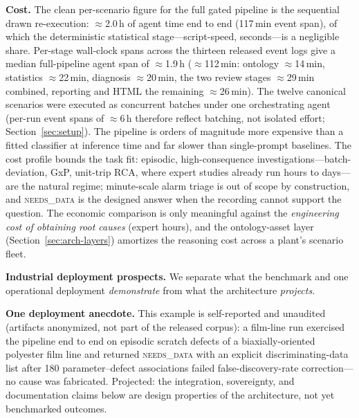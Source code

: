 \documentclass[preprint,10pt]{elsarticle}
\begin{document}
\textbf{Cost.} The clean per-scenario figure for the full gated pipeline is the sequential drawn re-execution: $\approx$2.0\,h of agent time end to end (117\,min event span), of which the deterministic statistical stage---script-speed, seconds---is a negligible share. Per-stage wall-clock spans across the thirteen released event logs give a median full-pipeline agent span of $\approx$1.9\,h ($\approx$112\,min: ontology $\approx$14\,min, statistics $\approx$22\,min, diagnosis $\approx$20\,min, the two review stages $\approx$29\,min combined, reporting and HTML the remaining $\approx$26\,min). The twelve canonical scenarios were executed as concurrent batches under one orchestrating agent (per-run event spans of $\approx$6\,h therefore reflect batching, not isolated effort; Section~\ref{sec:setup}). The pipeline is orders of magnitude more expensive than a fitted classifier at inference time and far slower than single-prompt baselines. The cost profile bounds the task fit: episodic, high-consequence investigations---batch-deviation, GxP, unit-trip RCA, where expert studies already run hours to days---are the natural regime; minute-scale alarm triage is out of scope by construction, and \textsc{needs\_data} is the designed answer when the recording cannot support the question. The economic comparison is only meaningful against the \emph{engineering cost of obtaining root causes} (expert hours), and the ontology-asset layer (Section~\ref{sec:arch-layers}) amortizes the reasoning cost across a plant's scenario fleet.

\textbf{Industrial deployment prospects.}
We separate what the benchmark and one operational deployment \emph{demonstrate} from what the architecture \emph{projects}.

\textbf{One deployment anecdote.} This example is self-reported and unaudited (artifacts anonymized, not part of the released corpus): a film-line run exercised the pipeline end to end on episodic scratch defects of a biaxially-oriented polyester film line and returned \mbox{\textsc{needs\_data}} with an explicit discriminating-data list after 180 parameter--defect associations failed false-discovery-rate correction---no cause was fabricated. Projected: the integration, sovereignty, and documentation claims below are design properties of the architecture, not yet benchmarked outcomes.
\end{document}
